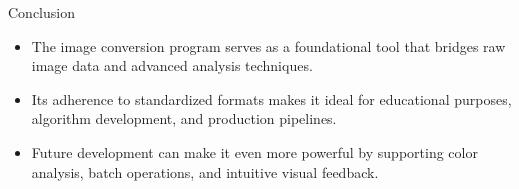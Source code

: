 \documentclass{beamer}
\begin{document}
\begin{frame}{Conclusion}
\begin{itemize}
    \item The image conversion program serves as a foundational tool that bridges raw image data and advanced analysis techniques.
    \item Its adherence to standardized formats makes it ideal for educational purposes, algorithm development, and production pipelines.
    \item Future development can make it even more powerful by supporting color analysis, batch operations, and intuitive visual feedback.
\end{itemize}
\end{frame}
\end{document}
